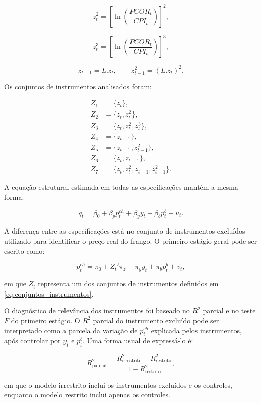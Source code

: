 \documentclass[12pt,a4paper]{article}
\begin{document}
\[
z_t^2 =
\left[
\ln\left(\frac{PCOR_t}{CPI_t}\right)
\right]^2,
\tag{27}
\label{eq:z2}
\]

\[
z_t^3 =
\left[
\ln\left(\frac{PCOR_t}{CPI_t}\right)
\right]^3,
\tag{28}
\label{eq:z3}
\]

\[
z_{t-1}
=
L.z_t,
\qquad
z_{t-1}^2
=
(L.z_t)^2.
\tag{29}
\label{eq:z_lags}
\]

Os conjuntos de instrumentos analisados foram:

\[
\begin{aligned}
Z_1 &= \{z_t\},\\
Z_2 &= \{z_t,z_t^2\},\\
Z_3 &= \{z_t,z_t^2,z_t^3\},\\
Z_4 &= \{z_{t-1}\},\\
Z_5 &= \{z_{t-1},z_{t-1}^2\},\\
Z_6 &= \{z_t,z_{t-1}\},\\
Z_7 &= \{z_t,z_t^2,z_{t-1},z_{t-1}^2\}.
\end{aligned}
\tag{30}
\label{eq:conjuntos_instrumentos}
\]

A equação estrutural estimada em todas as especificações mantém a mesma forma:

\[
q_t = \beta_0 + \beta_p p^{ch}_t + \beta_y y_t + \beta_b p^b_t + u_t.
\tag{31}
\label{eq:base_estrutural}
\]

A diferença entre as especificações está no conjunto de instrumentos excluídos utilizado para identificar o preço real do frango. O primeiro estágio geral pode ser escrito como:

\[
p^{ch}_t
=
\pi_0
+
Z_t'\pi_z
+
\pi_y y_t
+
\pi_b p^b_t
+
v_t,
\tag{32}
\label{eq:base_primeiro_estagio}
\]

em que \(Z_t\) representa um dos conjuntos de instrumentos definidos em \eqref{eq:conjuntos_instrumentos}.

O diagnóstico de relevância dos instrumentos foi baseado no \(R^2\) parcial e no teste \(F\) do primeiro estágio. O \(R^2\) parcial do instrumento excluído pode ser interpretado como a parcela da variação de \(p^{ch}_t\) explicada pelos instrumentos, após controlar por \(y_t\) e \(p^b_t\). Uma forma usual de expressá-lo é:

\[
R^2_{\text{parcial}}
=
\frac{R^2_{\text{irrestrito}} - R^2_{\text{restrito}}}
{1 - R^2_{\text{restrito}}},
\tag{33}
\label{eq:r2_parcial}
\]

em que o modelo irrestrito inclui os instrumentos excluídos e os controles, enquanto o modelo restrito inclui apenas os controles.
\end{document}
